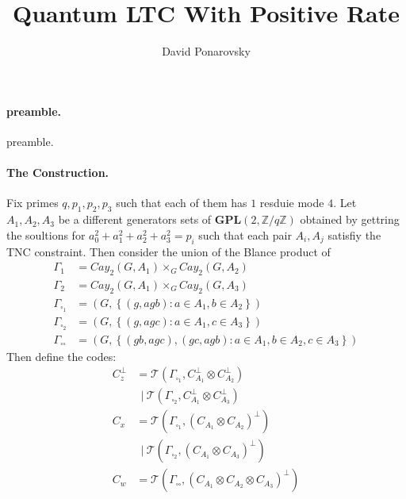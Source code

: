 \documentclass{article}
\begin{document}
\title{Quantum LTC With Positive Rate}
\author{David Ponarovsky}
\maketitle
\begin{multicols*}{2}


  \paragraph{preamble.} preamble.  
  \paragraph{The Construction.} Fix primes $q,p_1,p_2,p_3$ such that each of them has $1 $ resduie mode $4$. Let $A_{1},A_{2},A_{3}$ be a different generators sets of $ \mathbf{GPL}(2 , \mathbb{Z} / q\mathbb{Z} )  $ 
  obtained by gettring the soultions for $a_{0}^{2} + a_{1}^{2} +a_{2}^{2} +a_{3}^{2} = p_i $ such that each pair $A_i,A_j$ satisfiy the 
  TNC constraint. Then consider the union of the Blance product of 
  \begin{equation*}
    \begin{split}
      \Gamma_{1}  &= Cay_{2}\left(  G, A_{1} \right)\times_{G} Cay_{2}\left(  G, A_{2} \right) \\
      \Gamma_{2}  &= Cay_{2}\left(  G, A_{1} \right)\times_{G} Cay_{2}\left(  G, A_{3} \right) \\
      \Gamma_{\square_{1}} &= \left( G, \left\{ \left( g, agb \right) : a \in A_{1}, b \in A_{2} \right\}  \right) \\
      \Gamma_{\square_{2}} &= \left( G, \left\{ \left( g, agc \right) : a \in A_{1}, c \in A_{3} \right\}  \right) \\
      \Gamma_{\square \square} &= \left( G, \left\{ \left( gb, agc \right), \left( gc, agb \right) :
      a \in A_{1}, b \in A_{2}, c \in A_{3} \right\}  \right) 
    \end{split}
  \end{equation*}
   Then define the codes:
	\begin{equation*}
	  \begin{split}
	    C_{z}^{\perp} & = \mathcal{T}\left( \Gamma_{\square_{1}}, C_{A_1}^{\perp} \otimes  C_{A_2}^{\perp}  \right) \\
	    & \ \ | \ \mathcal{T}\left(  \Gamma_{\square_{2}}, C_{A_1}^{\perp} \otimes C_{A_3}^{\perp}  \right) \\
	    C_{x} &=  \mathcal{T}\left(  \Gamma_{\square_{1}}, \left(  C_{A_1} \otimes C_{A_2} \right)^{\perp}  \right) \\
	    & \ \ | \ \mathcal{T}\left( \Gamma_{\square_{2}}, \left(  C_{A_1} \otimes C_{A_3} \right)^{\perp}  \right) \\
	    C_{w} &=  \mathcal{T}\left( \Gamma_{\square \square}, \left(  C_{A_1} \otimes C_{A_2} \otimes C_{A_3} \right)^{\perp}  \right)   
	  \end{split}
	\end{equation*}

\end{multicols*}
\end{document}
